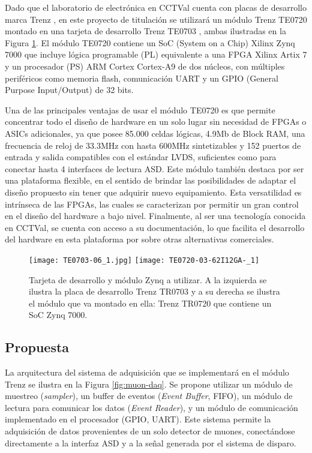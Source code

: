 		Dado que el laboratorio de electrónica en CCTVal cuenta con placas de desarrollo marca Trenz , en este proyecto de titulación se utilizará un módulo Trenz TE0720 \cite{TrenzElectronic2020TE0720Wiki} montado en una tarjeta de desarrollo Trenz TE0703 \cite{TrenzElectronic2019TE0703Wiki}, ambas ilustradas en la Figura \ref{fig:trenz}. El módulo TE0720 contiene un SoC (System on a Chip) Xilinx Zynq 7000 \cite{Xilinx2012Zynq-7000Architecture} que incluye lógica programable (PL) equivalente a una FPGA Xilinx Artix 7\cite{Xilinx20107DS180} y un procesador (PS) ARM Cortex Cortex-A9 de dos núcleos, con múltiples periféricos como memoria flash, comunicación UART y un GPIO (General Purpose Input/Output) de 32 bits.
		
		Una de las principales ventajas de usar el módulo TE0720 es que permite concentrar todo el diseño de hardware en un solo lugar sin necesidad de FPGAs o ASICs adicionales, ya que posee 85.000 celdas lógicas, 4.9Mb de Block RAM, una frecuencia de reloj de 33.3MHz con hasta 600MHz sintetizables y 152 puertos de entrada y salida compatibles con el estándar LVDS, suficientes como para conectar hasta 4 interfaces de lectura ASD. Este módulo también destaca por ser una plataforma flexible, en el sentido de brindar las posibilidades de adaptar el diseño propuesto sin tener que adquirir nuevo equipamiento. Esta versatilidad es intrínseca de las FPGAs, las cuales se caracterizan por permitir un gran control en el diseño del hardware a bajo nivel. Finalmente, al ser una tecnología conocida en CCTVal, se cuenta con acceso a su documentación, lo que facilita el desarrollo del hardware en esta plataforma por sobre otras alternativas comerciales.
		
		\begin{figure}[H]
			\centering
			\texttt{[image: TE0703-06\_1.jpg]}
			\texttt{[image: TE0720-03-62I12GA-\_1]}
			\caption{Tarjeta de desarrollo y módulo Zynq a utilizar. A la izquierda se ilustra la placa de desarrollo Trenz TR0703\cite{TrenzElectronic2019TE0703Wiki} y a su derecha se ilustra el módulo que va montado en ella: Trenz TR0720\cite{TrenzElectronic2020TE0720Wiki} que contiene un SoC Zynq 7000\cite{}.}
			\label{fig:trenz}
		\end{figure}
	
	\subsection{Propuesta}
		La arquitectura del sistema de adquisición que se implementará en el módulo Trenz se ilustra en la Figura \ref{fig:muon-daq}. Se propone utilizar un módulo de muestreo (\textit{sampler}), un buffer de eventos (\textit{Event Buffer}, FIFO), un módulo de lectura para comunicar los datos (\textit{Event Reader}), y un módulo de comunicación implementado en el procesador (GPIO, UART). Este sistema permite la adquisición de datos provenientes de un solo detector de muones, conectándose directamente a la interfaz ASD y a la señal generada por el sistema de disparo.
		
